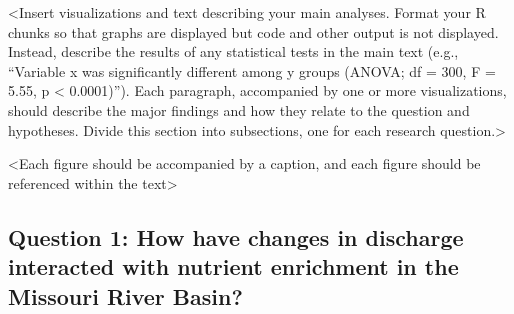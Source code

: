 \documentclass[12pt,]{article}
\begin{document}
\textless{}Insert visualizations and text describing your main analyses.
Format your R chunks so that graphs are displayed but code and other
output is not displayed. Instead, describe the results of any
statistical tests in the main text (e.g., ``Variable x was significantly
different among y groups (ANOVA; df = 300, F = 5.55, p \textless{}
0.0001)''). Each paragraph, accompanied by one or more visualizations,
should describe the major findings and how they relate to the question
and hypotheses. Divide this section into subsections, one for each
research question.\textgreater{}

\textless{}Each figure should be accompanied by a caption, and each
figure should be referenced within the text\textgreater{}

\hypertarget{question-1-how-have-changes-in-discharge-interacted-with-nutrient-enrichment-in-the-missouri-river-basin}{%
\subsection{Question 1: How have changes in discharge interacted with
nutrient enrichment in the Missouri River
Basin?}\label{question-1-how-have-changes-in-discharge-interacted-with-nutrient-enrichment-in-the-missouri-river-basin}}
\end{document}
